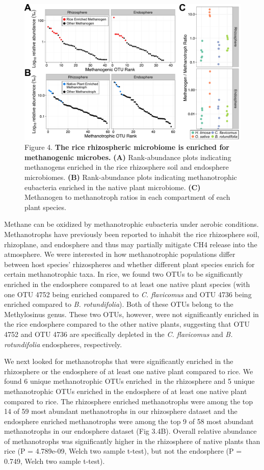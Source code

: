 \begin{figure}[h]
\centering
\includegraphics[width=5in]{Figures/figure2_4}
\caption[Figure 3.4]{Figure 4. \textbf{The rice rhizospheric microbiome is enriched for methanogenic microbes.} \textbf{(A)} Rank-abundance plots indicating methanogens enriched in the rice rhizosphere soil and endosphere microbiomes. \textbf{(B)} Rank-abundance plots indicating methanotrophic eubacteria enriched in the native plant microbiome. \textbf{(C)} Methanogen to methanotroph ratios in each compartment of each plant species.}
\label{Figure 3.4}
\end{figure}

Methane can be oxidized by methanotrophic eubacteria under aerobic conditions. Methanotrophs have previously been reported to inhabit the rice rhizosphere soil, rhizoplane, and endosphere and thus may partially mitigate CH4 release into the atmosphere. We were interested in how methanotrophic populations differ between host species' rhizospheres and whether different plant species enrich for certain methanotrophic taxa. In rice, we found two OTUs to be significantly enriched in the endosphere compared to at least one native plant species (with one OTU 4752 being enriched compared to \textit{C. flavicomus} and OTU 4736 being enriched compared to \textit{B. rotundifolia}). Both of these OTUs belong to the Methylosinus genus. These two OTUs, however, were not significantly enriched in the rice endosphere compared to the other native plants, suggesting that OTU 4752 and OTU 4736 are specifically depleted in the \textit{C. flavicomus} and \textit{B. rotundifolia} endospheres, respectively. 

We next looked for methanotrophs that were significantly enriched in the rhizosphere or the endosphere of at least one native plant compared to rice. We found 6 unique methanotrophic OTUs enriched in the rhizosphere and 5 unique methanotrophic OTUs enriched in the endosphere of at least one native plant compared to rice. The rhizosphere enriched methanotrophs were among the top 14 of 59 most abundant methanotrophs in our rhizosphere dataset and the endosphere enriched methanotrophs were among the top 9 of 58 most abundant methanotrophs in our endosphere dataset (Fig 3.4B). Overall relative abundance of methanotrophs was significantly higher in the rhizosphere of native plants than rice (P = 4.789e-09, Welch two sample t-test), but not the endosphere (P = 0.749, Welch two sample t-test).

